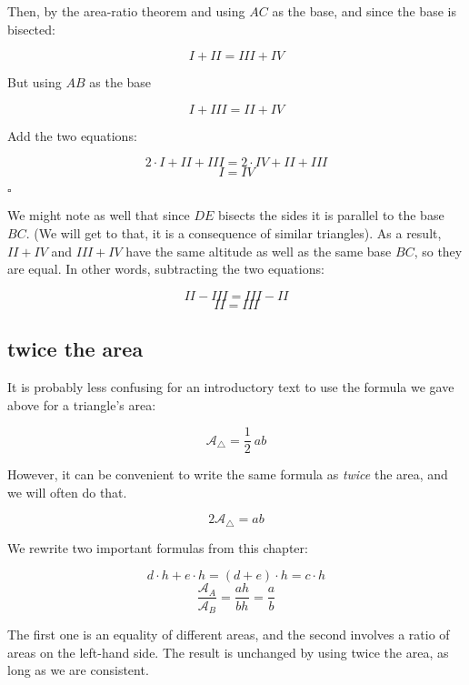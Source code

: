 \documentclass[11pt, oneside]{article}
\begin{document}
Then, by the area-ratio theorem and using $AC$ as the base, and since the base is bisected:

\[ I + II = III + IV \]

But using $AB$ as the base

\[ I + III = II + IV \]

Add the two equations:

\[ 2 \cdot I + II + III = 2 \cdot IV + II + III \]
\[ I = IV  \]

$\square$

We might note as well that since $DE$ bisects the sides it is parallel to the base $BC$.  (We will get to that, it is a consequence of similar triangles).  As a result, $II + IV$ and $III + IV$ have the same altitude as well as the same base $BC$, so they are equal.  In other words, subtracting the two equations:

\[ II - III = III - II \]
\[ II = III \]

\subsection*{twice the area}

It is probably less confusing for an introductory text to use the formula we gave above for a triangle's area:

\[ \mathcal{A}_{\triangle} = \frac{1}{2} \ ab \]

However, it can be convenient to write the same formula as \emph{twice} the area, and we will often do that.

\[ 2 \mathcal{A}_{\triangle} = ab \]

We rewrite two important formulas from this chapter:

\[ d \cdot h + e \cdot h = (d+e) \cdot h = c \cdot h \]
\[ \frac{\mathcal{A}_A}{\mathcal{A}_B} = \frac{ah}{bh} = \frac{a}{b} \]

The first one is an equality of different areas, and the second involves a ratio of areas on the left-hand side.  The result is unchanged by using twice the area, as long as we are consistent.
\end{document}
